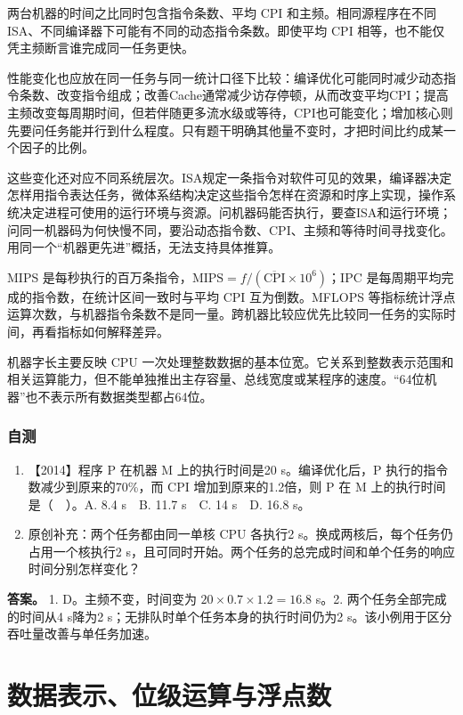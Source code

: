 两台机器的时间之比同时包含指令条数、平均 CPI 和主频。相同源程序在不同 ISA、不同编译器下可能有不同的动态指令条数。即使平均 CPI 相等，也不能仅凭主频断言谁完成同一任务更快。

性能变化也应放在同一任务与同一统计口径下比较：编译优化可能同时减少动态指令条数、改变指令组成；改善Cache通常减少访存停顿，从而改变平均CPI；提高主频改变每周期时间，但若伴随更多流水级或等待，CPI也可能变化；增加核心则先要问任务能并行到什么程度。只有题干明确其他量不变时，才把时间比约成某一个因子的比例。

这些变化还对应不同系统层次。ISA规定一条指令对软件可见的效果，编译器决定怎样用指令表达任务，微体系结构决定这些指令怎样在资源和时序上实现，操作系统决定进程可使用的运行环境与资源。问机器码能否执行，要查ISA和运行环境；问同一机器码为何快慢不同，要沿动态指令数、CPI、主频和等待时间寻找变化。用同一个``机器更先进''概括，无法支持具体推算。

MIPS 是每秒执行的百万条指令，\(\mathrm{MIPS}=f/(\overline{\mathrm{CPI}}\times10^6)\)；IPC 是每周期平均完成的指令数，在统计区间一致时与平均 CPI 互为倒数。MFLOPS 等指标统计浮点运算次数，与机器指令条数不是同一量。跨机器比较应优先比较同一任务的实际时间，再看指标如何解释差异。

机器字长主要反映 CPU 一次处理整数数据的基本位宽。它关系到整数表示范围和相关运算能力，但不能单独推出主存容量、总线宽度或某程序的速度。``64位机器''也不表示所有数据类型都占64位。

\subsection{自测}\label{co-self1}

\begin{enumerate}
\def\labelenumi{\arabic{enumi}.}
\tightlist
\item
  【2014】程序 P 在机器 M 上的执行时间是20 s。编译优化后，P 执行的指令数减少到原来的70\%，而 CPI 增加到原来的1.2倍，则 P 在 M 上的执行时间是（　）。A. 8.4 s　B. 11.7 s　C. 14 s　D. 16.8 s。
\item
  原创补充：两个任务都由同一单核 CPU 各执行2 s。换成两核后，每个任务仍占用一个核执行2 s，且可同时开始。两个任务的总完成时间和单个任务的响应时间分别怎样变化？
\end{enumerate}

\textbf{答案。} 1. D。主频不变，时间变为 \(20\times0.7\times1.2=16.8\) s。2. 两个任务全部完成的时间从4 s降为2 s；无排队时单个任务本身的执行时间仍为2 s。该小例用于区分吞吐量改善与单任务加速。

\chapter{数据表示、位级运算与浮点数}\label{co-ch2}

